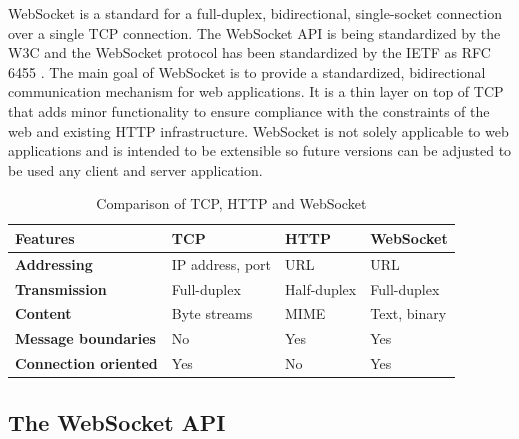 WebSocket is a standard for a full-duplex, bidirectional, single-socket connection over a single TCP connection. The WebSocket API is being standardized by the W3C and the WebSocket protocol has been standardized by the IETF as RFC 6455 \cite{hickson2011websocket,fette2011websocket}. The main goal of WebSocket is to provide a standardized, bidirectional communication mechanism for web applications. It is a thin layer on top of TCP that adds minor functionality to ensure compliance with the constraints of the web and existing HTTP infrastructure. WebSocket is not solely applicable to web applications and is intended to be extensible so future versions can be adjusted to be used any client and server application.
\\
\begin{table}[h!]
\centering
\begin{tabular}{llll}
\hline
\textbf{Features}    & \textbf{TCP}        & \textbf{HTTP} & \textbf{WebSocket}       \\ \hline
\textbf{Addressing}           & IP address, port    & URL           & URL                      \\
\textbf{Transmission}         & Full-duplex         & Half-duplex   & Full-duplex              \\
\textbf{Content}              & Byte streams        & MIME			& Text, binary				 \\
\textbf{Message boundaries}   & No                  & Yes           & Yes                       \\
\textbf{Connection oriented}  & Yes                 & No            & Yes						  \\
\hline                         
\end{tabular}
\caption{Comparison of TCP, HTTP and WebSocket \cite{wang2013definitive}}
\label{table:tcpHttpWebsocketComparison}
\end{table}

\subsection{The WebSocket API}


